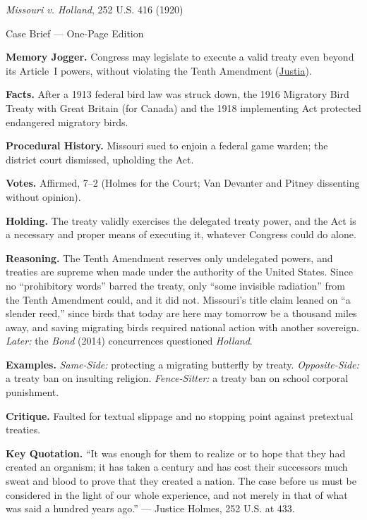 \documentclass[12pt]{article}
\begin{document}
\begin{center}
{\Large \textit{Missouri v. Holland}, 252 U.S. 416 (1920)\par}
\vspace{0.3em}
{\normalsize Case Brief --- One-Page Edition\par}
\end{center}

\textbf{Memory Jogger.} Congress may legislate to execute a valid treaty even beyond its Article~I powers, without violating the Tenth Amendment (\href{https://supreme.justia.com/cases/federal/us/252/416/}{Justia}).

\textbf{Facts.} After a 1913 federal bird law was struck down, the 1916 Migratory Bird Treaty with Great Britain (for Canada) and the 1918 implementing Act protected endangered migratory birds.

\textbf{Procedural History.} Missouri sued to enjoin a federal game warden; the district court dismissed, upholding the Act.

\textbf{Votes.} Affirmed, 7--2 (Holmes for the Court; Van Devanter and Pitney dissenting without opinion).

\textbf{Holding.} The treaty validly exercises the delegated treaty power, and the Act is a necessary and proper means of executing it, whatever Congress could do alone.

\textbf{Reasoning.} The Tenth Amendment reserves only undelegated powers, and treaties are supreme when made under the authority of the United States. Since no ``prohibitory words'' barred the treaty, only ``some invisible radiation'' from the Tenth Amendment could, and it did not. Missouri's title claim leaned on ``a slender reed,'' since birds that today are here may tomorrow be a thousand miles away, and saving migrating birds required national action with another sovereign. \emph{Later:} the \textit{Bond} (2014) concurrences questioned \textit{Holland}.

\textbf{Examples.} \emph{Same-Side:} protecting a migrating butterfly by treaty. \emph{Opposite-Side:} a treaty ban on insulting religion. \emph{Fence-Sitter:} a treaty ban on school corporal punishment.

\textbf{Critique.} Faulted for textual slippage and no stopping point against pretextual treaties.

\textbf{Key Quotation.} ``It was enough for them to realize or to hope that they had created an organism; it has taken a century and has cost their successors much sweat and blood to prove that they created a nation. The case before us must be considered in the light of our whole experience, and not merely in that of what was said a hundred years ago.'' --- Justice Holmes, 252 U.S. at 433.
\end{document}
